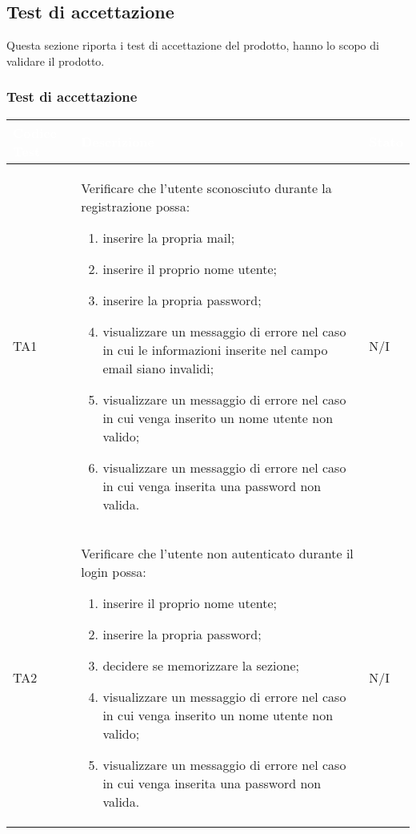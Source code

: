 \subsection{Test di accettazione}
Questa sezione  riporta i test di accettazione del prodotto, hanno lo scopo di validare il prodotto.

\subsubsection{Test di accettazione}

{
    \setlength{\freewidth}{\dimexpr\textwidth-10\tabcolsep}
    \renewcommand{\arraystretch}{1.5}
    \centering
    \setlength{\aboverulesep}{0pt}
    \setlength{\belowrulesep}{0pt}
    \begin{longtable}{C{.1\freewidth} C{.80\freewidth} C{.1\freewidth}}
       \toprule
    \textcolor{white}{\textbf{Codice Test}}&
    \textcolor{white}{\textbf{Descrizione}}&
    \textcolor{white}{\textbf{Stato}} \\	
    \toprule
    \endhead

    TA1 & Verificare che l'utente sconosciuto durante la registrazione possa: \begin{enumerate}
        \item inserire la propria mail;
        \item inserire il proprio nome utente;
        \item  inserire la propria password;
        \item visualizzare un messaggio di errore nel caso in cui le informazioni inserite nel campo email siano invalidi;
        \item visualizzare un messaggio di errore nel caso in cui venga inserito un nome utente non valido;
        \item visualizzare un messaggio di errore nel caso in cui venga inserita una password  non valida.
    \end{enumerate}  & N/I \\

    TA2 & Verificare che l'utente non autenticato durante il login possa:\begin{enumerate}
        \item  inserire il proprio nome utente;
        \item   inserire la propria password;
        \item   decidere se memorizzare la sezione;
        \item   visualizzare un messaggio di errore nel caso in cui venga inserito un nome utente non valido;
        \item  visualizzare un messaggio di errore nel caso in cui venga inserita una password  non valida.
    \end{enumerate} & N/I  \\
 

\end{longtable}}
